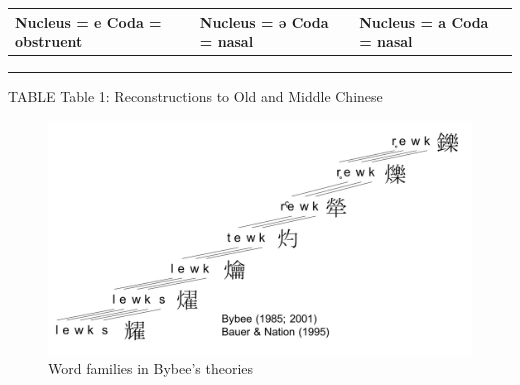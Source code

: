 \begin{longtable}[]{@{}lll@{}}
\toprule
\begin{minipage}[b]{0.33\columnwidth}\raggedright\strut
Nucleus = e Coda = obstruent\strut
\end{minipage} & \begin{minipage}[b]{0.29\columnwidth}\raggedright\strut
Nucleus = ə Coda = nasal\strut
\end{minipage} & \begin{minipage}[b]{0.29\columnwidth}\raggedright\strut
Nucleus = a Coda = nasal\strut
\end{minipage}\tabularnewline
\midrule
\endhead
\begin{minipage}[t]{0.33\columnwidth}\raggedright\strut
\strut
\end{minipage} & \begin{minipage}[t]{0.29\columnwidth}\raggedright\strut
\strut
\end{minipage} & \begin{minipage}[t]{0.29\columnwidth}\raggedright\strut
\strut
\end{minipage}\tabularnewline
\begin{minipage}[t]{0.33\columnwidth}\raggedright\strut
\strut
\end{minipage} & \begin{minipage}[t]{0.29\columnwidth}\raggedright\strut
\strut
\end{minipage} & \begin{minipage}[t]{0.29\columnwidth}\raggedright\strut
\strut
\end{minipage}\tabularnewline
\begin{minipage}[t]{0.33\columnwidth}\raggedright\strut
\strut
\end{minipage} & \begin{minipage}[t]{0.29\columnwidth}\raggedright\strut
\strut
\end{minipage} & \begin{minipage}[t]{0.29\columnwidth}\raggedright\strut
\strut
\end{minipage}\tabularnewline
\bottomrule
\end{longtable}

TABLE Table 1: Reconstructions to Old and Middle Chinese

\begin{figure}
\includegraphics[width=5in]{ideos/bybee} \caption{Word families in Bybee's theories}\label{fig:bybee}
\end{figure}

